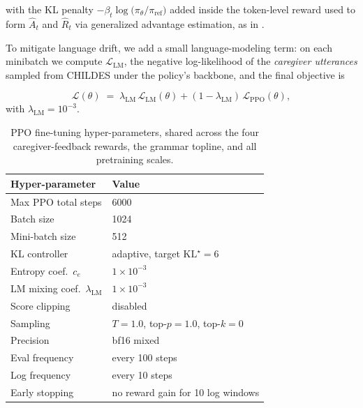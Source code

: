 with the KL penalty $-\beta_t \log\!\big(\pi_\theta / \pi_{\text{ref}}\big)$
added inside the token-level reward used to form $\hat{A}_t$ and $\hat{R}_t$ via generalized advantage estimation, as in \citet{vonwerra2020trl}. 


To mitigate language drift, we add a small language-modeling term: on each minibatch we compute
$\mathcal{L}_{\text{LM}}$, the negative log-likelihood of the \emph{caregiver utterances} sampled from CHILDES under the policy's backbone, and the final objective is

\begin{equation}
\label{eq:final-loss}
\mathcal{L}(\theta) \;=\; \lambda_{\text{LM}}\, \mathcal{L}_{\text{LM}}(\theta)
+ (1 - \lambda_{\text{LM}})\, \mathcal{L}_{\text{PPO}}(\theta),
\end{equation}
with $\lambda_{\text{LM}} = 10^{-3}$.




\fi
\begin{table}[t]
\centering
\small
\begin{tabular}{ll}
\toprule
\textbf{Hyper-parameter} & \textbf{Value} \\
\midrule
Max PPO total steps                 & 6000 \\
Batch size                       & 1024 \\
Mini-batch size                  & 512 \\
KL controller                    & adaptive, target $\text{KL}^\star=6$ \\
Entropy coef.\ $c_e$             & $1\times10^{-3}$ \\
LM mixing coef.\ $\lambda_{\text{LM}}$ & $1\times10^{-3}$ \\
Score clipping                   & disabled \\
Sampling                         & $T{=}1.0$, top-$p{=}1.0$, top-$k{=}0$ \\
Precision                        & bf16 mixed \\
Eval frequency                   & every 100 steps \\
Log frequency                    & every 10 steps \\
Early stopping                   & no reward gain for 10 log windows \\
\bottomrule
\end{tabular}
\caption{PPO fine-tuning hyper-parameters, shared across the four caregiver-feedback rewards, the grammar topline, and all pretraining scales.}
\label{tab:ppo-hparams}
\end{table}







\clearpage
\endgroup
